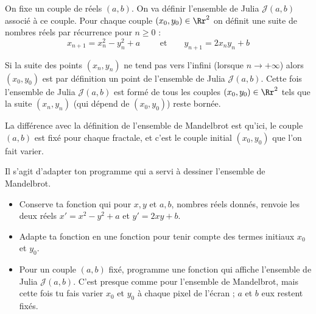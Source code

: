 \documentclass[11pt,class=report,crop=false]{standalone}
\begin{document}
\begin{cours}



On fixe un couple de réels $(a,b)$. On va définir l'ensemble de Julia $\mathcal{J}(a,b)$ associé à ce couple.
Pour chaque couple $(x_0,y_0) \in \Rr^2$ on définit une suite de nombres réels par récurrence pour $n\ge0$ :
$$x_{n+1} = x_n^2 - y_n^2 + a \qquad \text{ et} \qquad y_{n+1} = 2 x_n y_n + b $$

Si la suite des points $(x_n,y_n)$ ne tend pas vers l'infini (lorsque $n \to +\infty$) alors $(x_0,y_0)$ est par définition un point de l'ensemble de Julia $\mathcal{J}(a,b)$.
Cette fois l'ensemble de Julia $\mathcal{J}(a,b)$ est formé de tous les couples $(x_0,y_0) \in \Rr^2$ tels que la suite $(x_n,y_n)$ (qui dépend de $(x_0,y_0)$) reste bornée.

La différence avec la définition de l'ensemble de Mandelbrot est qu'ici, le couple $(a,b)$ est fixé pour chaque fractale, et c'est le couple initial $(x_0,y_0)$ que l'on fait varier.

\end{cours}




\begin{activite}


Il s'agit d'adapter ton programme qui a servi à dessiner l'ensemble de Mandelbrot.

\begin{itemize}
  \item Conserve ta fonction  qui pour $x,y$ et $a,b$, nombres réels donnés, renvoie les deux réels $x' = x^2-y^2+a$ et $y' = 2xy+b$.
  
  \item Adapte ta fonction  en une fonction 
  pour tenir compte des termes initiaux $x_0$ et $y_0$.
  
  \item Pour un couple $(a,b)$ fixé, programme une fonction 
  qui affiche l'ensemble de Julia $\mathcal{J}(a,b)$. C'est presque comme pour l'ensemble de Mandelbrot, mais cette fois tu fais varier $x_0$ et $y_0$ à chaque pixel de l'écran ; $a$ et $b$ eux restent fixés.
 
\end{itemize}
\end{activite}
\end{document}
